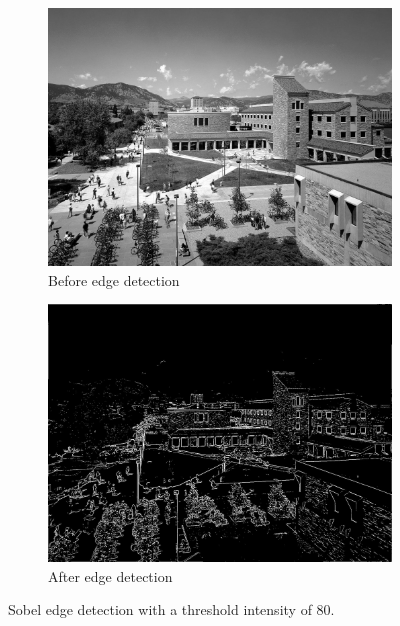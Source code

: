 \documentclass[11pt,a4paper]{article}
\begin{document}
\begin{figure}[ht]
	\centering
	\begin{subfigure}[h]{0.7\textwidth}
		\includegraphics[width=\textwidth]{figs/test01_gray}
		\caption{Before edge detection}
		\label{fig:test01_gray}
	\end{subfigure}
	\par
	\begin{subfigure}[h]{0.7\textwidth}
		\includegraphics[width=\textwidth]{figs/test01_edges}
		\caption{After edge detection}
		\label{fig:test01_edge}
	\end{subfigure}
	
	\caption{Sobel edge detection with a threshold intensity of 80.}
	\label{fig:edge01}
\end{figure}
\end{document}
